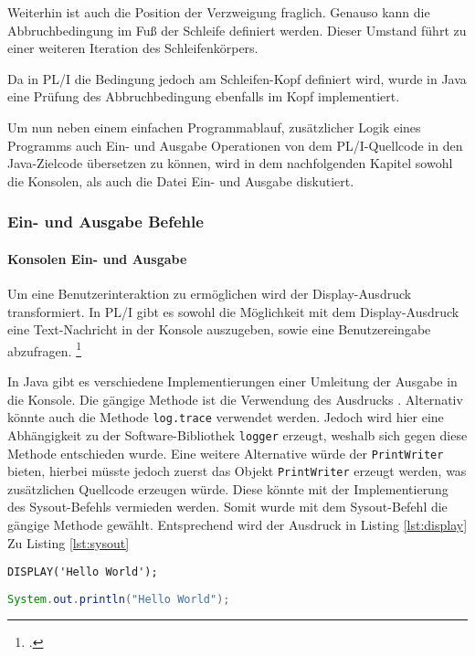 Weiterhin ist auch die Position der Verzweigung fraglich. Genauso kann die Abbruchbedingung im Fuß der Schleife definiert werden. Dieser Umstand führt zu einer weiteren Iteration des Schleifenkörpers. 

Da in PL/I die Bedingung jedoch am Schleifen-Kopf definiert wird, wurde in Java eine Prüfung des Abbruchbedingung ebenfalls im Kopf implementiert. 

Um nun neben einem einfachen Programmablauf, zusätzlicher Logik eines Programms auch Ein- und Ausgabe Operationen von dem PL/I-Quellcode in den Java-Zielcode übersetzen zu können, wird in dem nachfolgenden Kapitel sowohl die Konsolen, als auch die Datei Ein- und Ausgabe diskutiert.

\pagebreak
\subsubsection{Ein- und Ausgabe Befehle}
\paragraph{Konsolen Ein- und Ausgabe}
Um eine Benutzerinteraktion zu ermöglichen wird der Display-Ausdruck transformiert.
In PL/I gibt es sowohl die Möglichkeit mit dem Display-Ausdruck eine Text-Nachricht in der Konsole auszugeben, sowie eine Benutzereingabe abzufragen. \footcite[Vgl. ][S. 264ff.]{pliref}

In Java gibt es verschiedene Implementierungen einer Umleitung der Ausgabe in die Konsole.
Die gängige Methode ist die Verwendung des Ausdrucks . 
Alternativ könnte auch die Methode \verb+log.trace+ verwendet werden.
Jedoch wird hier eine Abhängigkeit zu der Software-Bibliothek \verb+logger+  erzeugt, weshalb sich gegen diese Methode entschieden wurde.
Eine weitere Alternative würde der \verb+PrintWriter+ bieten, hierbei müsste jedoch zuerst das Objekt \verb+PrintWriter+ erzeugt werden, was zusätzlichen Quellcode erzeugen würde. Diese könnte mit der Implementierung des Sysout-Befehls vermieden werden.
Somit wurde mit dem Sysout-Befehl die gängige Methode gewählt. Entsprechend wird der Ausdruck in Listing \ref{lst:display} Zu Listing \ref{lst:sysout}

\begin{lstlisting}[language=PL/I, caption=Display-Statments, label={lst:display}]
DISPLAY('Hello World');
\end{lstlisting} 

\begin{lstlisting}[language=Java, caption=\"Ubersetzung des Display-Statments, label={lst:sysout}]
System.out.println("Hello World");
\end{lstlisting} 


